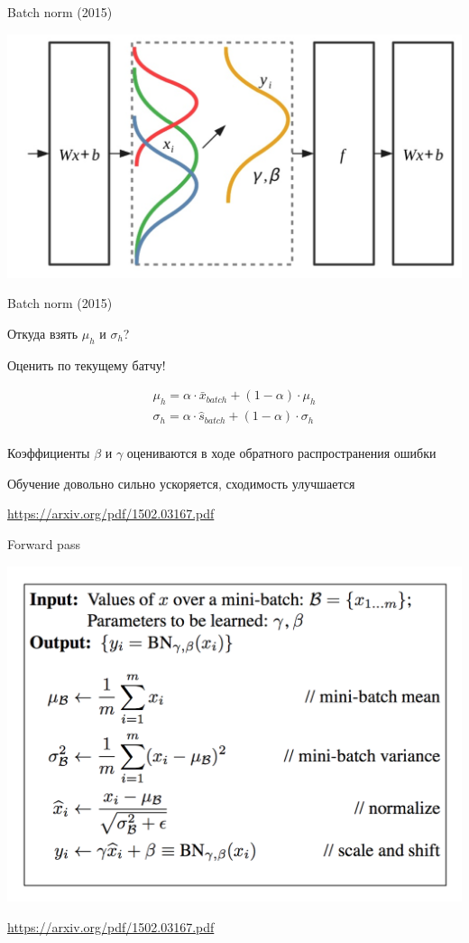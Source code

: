 \documentclass[notes,12pt, aspectratio=169]{beamer}
\newenvironment{wideitemize}{\itemize\addtolength{\itemsep}{10pt}}{\enditemize}
\begin{document}
\begin{frame}{Batch norm (2015)}
\begin{center}
	\includegraphics[width=.7\linewidth]{distributions_nice.png}
\end{center}
\end{frame}


\begin{frame}{Batch norm (2015)}
\begin{wideitemize}
\item  Откуда взять $\mu_h$ и $\sigma_h$? 

\item Оценить по текущему батчу! 

\begin{align*} 
\mu_h =  \alpha \cdot \bar x_{batch}  + (1 - \alpha) \cdot \mu_h \\ 
\sigma_h =  \alpha \cdot \hat s_{batch}  + (1 - \alpha) \cdot \sigma_h \\ 
\end{align*}

\item Коэффициенты $\beta$ и $\gamma$ оцениваются в ходе обратного распространения ошибки

\item Обучение довольно сильно ускоряется, сходимость улучшается 
\end{wideitemize}

\vfill %
\footnotesize
{\color{blue} \url{https://arxiv.org/pdf/1502.03167.pdf}}
\end{frame}


\begin{frame}{Forward pass}
\begin{center}
	\includegraphics[width=.6\linewidth]{batch_formulas.png}
\end{center}
\vfill %
\footnotesize
{\color{blue} \url{https://arxiv.org/pdf/1502.03167.pdf}}
\end{frame}
\end{document}
